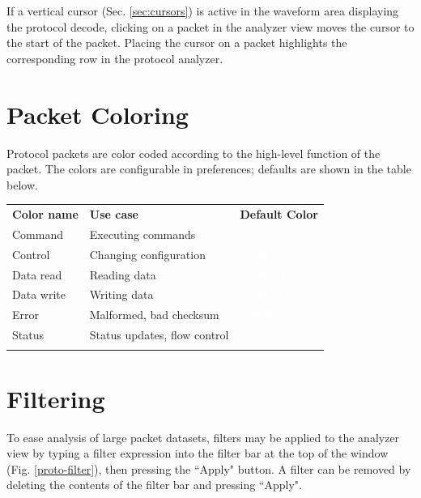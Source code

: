 If a vertical cursor (Sec. \ref{sec:cursors}) is active in the waveform area displaying the protocol decode, clicking
on a packet in the analyzer view moves the cursor to the start of the packet. Placing the cursor on a packet highlights
the corresponding row in the protocol analyzer.

\section{Packet Coloring}

Protocol packets are color coded according to the high-level function of the packet. The colors are configurable in
preferences; defaults are shown in the table below.

\begin{tabularx}{16cm}{llX}
\thickhline
\textbf{Color name} & \textbf{Use case} & \textbf{Default Color} \\
\thickhline
Command & Executing commands & \cellcolor{protocmd}\textcolor{white}{\#600050} \\
\thickhline
Control & Changing configuration & \cellcolor{protoctl}\textcolor{white}{\#808000} \\
\thickhline
Data read & Reading data & \cellcolor{protoread}\textcolor{white}{\#336699} \\
\thickhline
Data write & Writing data & \cellcolor{protowrite}\textcolor{white}{\#339966} \\
\thickhline
Error & Malformed, bad checksum & \cellcolor{protoerror}\textcolor{white}{\#ff0000} \\
\thickhline
Status & Status updates, flow control & \cellcolor{protostatus}\textcolor{white}{\#000080} \\
\thickhline
\end{tabularx}

\section{Filtering}

To ease analysis of large packet datasets, filters may be applied to the analyzer view by typing a filter expression
into the filter bar at the top of the window (Fig. \ref{proto-filter}), then pressing the ``Apply" button. A filter can
be removed by deleting the contents of the filter bar and pressing ``Apply".

